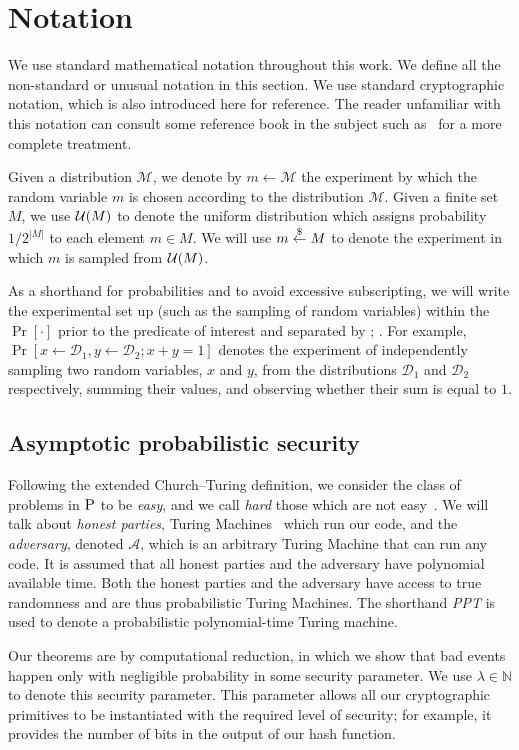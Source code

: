 \section{Notation}
We use standard mathematical notation throughout this work. We define all the
non-standard or unusual notation in this section. We use standard cryptographic
notation, which is also introduced here for reference. The reader unfamiliar
with this notation can consult some reference book in the subject such
as~\cite{katz} for a more complete treatment.

Given a distribution $\mathcal{M}$, we denote by $m \gets \mathcal{M}$ the experiment by which the random variable $m$ is chosen according to the distribution $\mathcal{M}$. Given a finite set $M$, we use $\mathcal{U}(M)$ to denote the uniform distribution which assigns probability $1 / 2^{|M|}$ to each element $m \in M$. We will use $m \overset{\$}{\gets} M$ to denote the experiment in which $m$ is sampled from $\mathcal{U}(M)$.

As a shorthand for probabilities and to avoid excessive subscripting, we will write the experimental set up (such as the sampling of random variables) within the $\Pr[\cdot]$ prior to the predicate of interest and separated by $;\,$. For example, $\Pr[x \gets \mathcal{D}_1, y \gets \mathcal{D}_2; x + y = 1]$ denotes the experiment of independently sampling two random variables, $x$ and $y$, from the distributions $\mathcal{D}_1$ and $\mathcal{D}_2$ respectively, summing their values, and observing whether their sum is equal to $1$.

\subsection{Asymptotic probabilistic security}
Following the extended Church--Turing definition, we consider the class of
problems in $\textsc{P}$ to be \emph{easy}, and we call \emph{hard} those which
are not easy~\cite{sipser}. We will talk about \emph{honest parties}, Turing
Machines~\cite{turing} which run our code, and the \emph{adversary}, denoted $\mathcal{A}$, which is an arbitrary
Turing Machine that can run any code. It is assumed that all honest parties and the adversary have polynomial available time. Both the honest parties and the adversary have access to true randomness and are thus probabilistic Turing Machines.
The shorthand \emph{PPT} is used to denote a probabilistic polynomial-time
Turing machine.

Our theorems are by computational reduction, in which we show that bad
events happen only with negligible probability in some security parameter. We
use $\lambda \in \mathbb{N}$ to denote this security parameter. This parameter allows all our
cryptographic primitives to be instantiated with the required level of security;
for example, it provides the number of bits in the output of our hash function.

